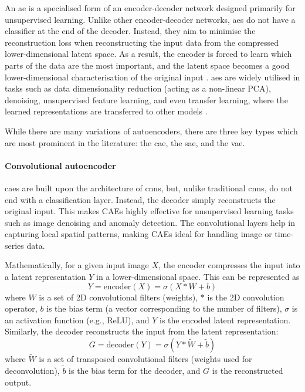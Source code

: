 An \acrlong{ae} is a specialised form of an encoder-decoder network designed primarily for unsupervised learning. Unlike other encoder-decoder networks, \acrlong{ae}s do not have a classifier at the end of the decoder. Instead, they aim to minimise the reconstruction loss when reconstructing the input data from the compressed lower-dimensional latent space. As a result, the encoder is forced to learn which parts of the data are the most important, and the latent space becomes a good lower-dimensional characterisation of the original input \cite{ng_sparse_2010}. \Acrlong{ae}s are widely utilised in tasks such as data dimensionality reduction (acting as a non-linear PCA), denoising, unsupervised feature learning, and even transfer learning, where the learned representations are transferred to other models \cite{goodfellow_deep_2016}.

While there are many variations of autoencoders, there are three key types which are most prominent in the literature: the \acrfull{cae}, the \acrfull{sae}, and the \acrfull{vae}.

\paragraph{Convolutional autoencoder} \acrshort{cae}s are built upon the architecture of \acrshort{cnn}s, but, unlike traditional \acrshort{cnn}s, do not end with a classification layer. Instead, the decoder simply reconstructs the original input. This makes CAEs highly effective for unsupervised learning tasks such as image denoising and anomaly detection. The convolutional layers help in capturing local spatial patterns, making CAEs ideal for handling image or time-series data. 

Mathematically, for a given input image $X$, the encoder compresses the input into a latent representation $Y$ in a lower-dimensional space. This can be represented as
\[
Y = \text{encoder}(X) = \sigma(X * W + b)
\]
where $W$ is a set of 2D convolutional filters (weights), $*$ is the 2D convolution operator, $b$ is the bias term (a vector corresponding to the number of filters), $\sigma$ is an activation function (e.g., ReLU), and $Y$ is the encoded latent representation. Similarly, the decoder reconstructs the input from the latent representation:
\[
G = \text{decoder}(Y) = \sigma(Y * \tilde{W} + \tilde{b})
\]
where $\tilde{W}$ is a set of transposed convolutional filters (weights used for deconvolution), $\tilde{b}$ is the bias term for the decoder, and $G$ is the reconstructed output.


